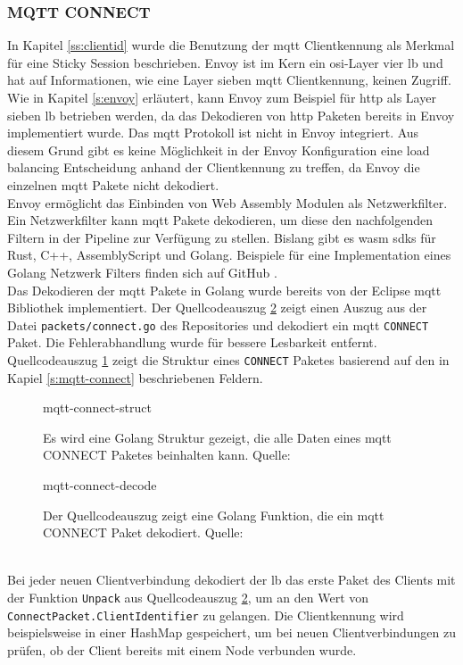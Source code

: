 \subsubsection{MQTT CONNECT}
In Kapitel \ref{ss:clientid} wurde die Benutzung der \ac{mqtt} Clientkennung als Merkmal für eine Sticky Session beschrieben. Envoy ist im Kern ein \ac{osi}-Layer vier \acl{lb} und hat auf Informationen, wie eine Layer sieben \ac{mqtt} Clientkennung, keinen Zugriff. Wie in Kapitel \ref{s:envoy} erläutert, kann Envoy zum Beispiel für \ac{http} als Layer sieben \ac{lb} betrieben werden, da das Dekodieren von \ac{http} Paketen bereits in Envoy implementiert wurde.
Das \ac{mqtt} Protokoll ist nicht in Envoy integriert. Aus diesem Grund gibt es keine Möglichkeit in der Envoy Konfiguration eine load balancing Entscheidung anhand der Clientkennung zu treffen, da Envoy die einzelnen \ac{mqtt} Pakete nicht dekodiert.
\\
Envoy ermöglicht das Einbinden von Web Assembly Modulen als Netzwerkfilter.
Ein Netzwerkfilter kann \ac{mqtt} Pakete dekodieren, um diese den nachfolgenden Filtern in der Pipeline zur Verfügung zu stellen.
Bislang gibt es \ac{wasm} \acp{sdk} für Rust, C++, AssemblyScript und Golang. \cite{sebastianHowWriteWASM} Beispiele für eine Implementation eines Golang Netzwerk Filters finden sich auf GitHub \cite{TetratelabsProxywasmgosdk2021}.
\\
Das Dekodieren der \ac{mqtt} Pakete in Golang wurde bereits von der Eclipse \ac{mqtt} Bibliothek \cite{EclipsePahoMqtt2021} implementiert.
Der Quellcodeauszug \ref{code:mqtt-connect-decode} zeigt einen Auszug aus der Datei \verb|packets/connect.go| des Repositories und dekodiert ein \ac{mqtt} \verb|CONNECT| Paket. Die Fehlerabhandlung wurde für bessere Lesbarkeit entfernt. Quellcodeauszug \ref{code:mqtt-connect-struct} zeigt die Struktur eines \verb|CONNECT| Paketes basierend auf den in Kapiel \ref{s:mqtt-connect} beschriebenen Feldern.
\begin{figure}
    {mqtt-connect-struct}
    \caption{Es wird eine Golang Struktur gezeigt, die alle Daten eines \ac{mqtt} CONNECT Paketes beinhalten kann. Quelle: \cite{EclipsePahoMqtt2021}}
    \label{code:mqtt-connect-struct}
\end{figure}
\begin{figure}
    {mqtt-connect-decode}
    \caption{Der Quellcodeauszug zeigt eine Golang Funktion, die ein \ac{mqtt} CONNECT Paket dekodiert. Quelle: \cite{EclipsePahoMqtt2021}}
    \label{code:mqtt-connect-decode}
\end{figure}
\\
Bei jeder neuen Clientverbindung dekodiert der \acl{lb} das erste Paket des Clients mit der Funktion \verb|Unpack| aus Quellcodeauszug \ref{code:mqtt-connect-decode}, um an den Wert von\newline
\verb|ConnectPacket.ClientIdentifier| zu gelangen.
Die Clientkennung wird beispielsweise in einer HashMap gespeichert, um bei neuen Clientverbindungen zu prüfen, ob der Client bereits mit einem Node verbunden wurde.

